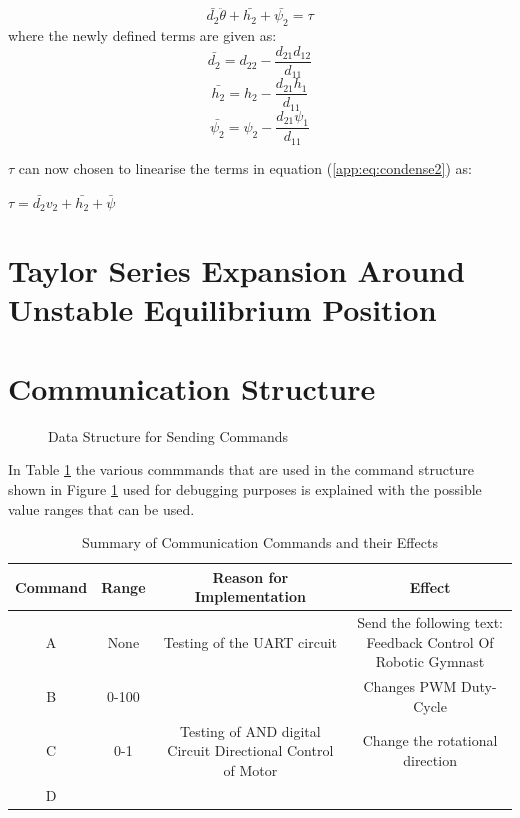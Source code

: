 \begin{equation} \label{app:eq:condense2}
\bar{d_{2}}\ddot{\theta} + \bar{h_{2}} + \bar{\psi_{2}} = \tau
\end{equation}
where the newly defined terms are given as: 
$$\bar{d_{2}} = d_{22} - \frac{d_{21}d_{12}}{d_{11}}$$
$$\bar{h_{2}} = h_{2} - \frac{d_{21}h_{1}}{d_{11}} $$
$$\bar{\psi_{2}} = \psi_{2} - \frac{d_{21}\psi_{1}}{d_{11}} $$


$\tau$ can now chosen to linearise the terms in equation (\ref{app:eq:condense2}) as:

$\tau = \bar{d_{2}}v_{2}+\bar{h_{2}} + \bar{\psi}$


\section{Taylor Series Expansion Around Unstable Equilibrium Position}
\label{sec:linerisation}






\section{Communication Structure}
\label{sec:software_requirements}
\begin{figure}[h]
	\centering
	
	\caption{Data Structure for Sending Commands}
	\label{fig:uart_struct_app}
\end{figure}

In Table \ref{table:uart_commands} the various commmands that are used in the command structure shown in Figure \ref{fig:uart_struct_app} used for debugging purposes is explained with the possible value ranges that can be used.


\begin{table}[h]
	\centering
	\begin{tabular}{|c|c|c|c|}
		\hline
		Command & Range &  Reason for Implementation & Effect \\
		\hline
		\hline
		A & None & Testing of the UART circuit & Send the following text: Feedback Control Of Robotic Gymnast\\
		\hline
		B & 0-100 &  & Changes PWM Duty-Cycle \\
		\hline
		C & 0-1 & Testing of AND digital Circuit Directional Control of Motor & Change the rotational direction \\
		\hline
		D & & & \\
		\hline
	
	\end{tabular}
	\caption{Summary of Communication Commands and their Effects}
	\label{table:uart_commands}

\end{table}


